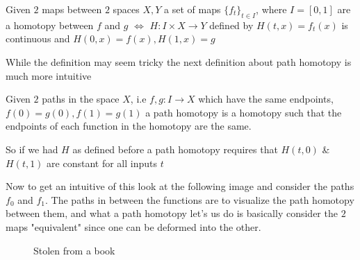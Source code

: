 \documentclass[paper=a4,fontsize=paper,12.5pt]{book}
\newcommand{\3}{\vspace*{3mm}}
\newcommand{\IFF}{$\Longleftrightarrow$ \hspace*{.5mm}}
\begin{document}
\begin{definition}

Given $2$ maps between $2$ spaces $X,Y$ a set of maps $\{{f}_{t}\}_{t \in I}$, where $I = [0,1]$ are a homotopy between $f$ and $g$ \IFF $H: I \times X \to Y$ defined by $H(t,x) = {f}_{t}(x)$ is continuous and $H(0,x) = f(x),H(1,x) = g$



\end{definition}

\3

While the definition may seem tricky the next definition about path homotopy is much more intuitive

\3

\begin{definition}

Given $2$ paths in the space $X$, i.e $f,g: I \to X$ which have the same endpoints, $f(0) = g(0), f(1) = g(1)$ a path homotopy is a homotopy such that the endpoints of each function in the homotopy are the same. 

\3

So if we had $H$ as defined before a path homotopy requires that $H(t,0)$ \&\ $H(t,1)$ are constant for all inputs $t$


\end{definition}

\3

Now to get an intuitive of this look at the following image and consider the paths ${f}_{0}$ and ${f}_{1}$. The paths in between the functions are to visualize the path homotopy between them, and what a path homotopy let's us do is basically consider the $2$ maps "equivalent" since one can be deformed into the other.

\3

{
 \begin{figure}[!hbt]
 \begin{center}
 \begin{minipage}{0.85\textwidth}
 \caption{\label{1}\small{Stolen from a book}}
 \end{minipage}
 \end{center}
 \end{figure}
 }

\3
\end{document}
